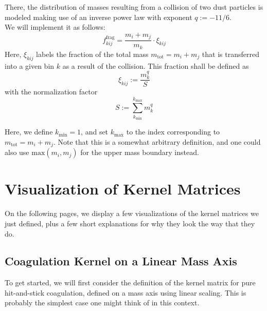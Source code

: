         There, the distribution of masses resulting from a collision of two dust particles 
        is modeled making use of an inverse power law with exponent $q := - 11/6$. \\

        We will implement it as follows:
        \begin{equation}
            f^\text{frag}_{kij} = \frac{m_i + m_j}{m_k} \cdot \xi_{kij}
        \end{equation}
        Here, $\xi_{kij}$ labels the fraction of the total mass $m_\text{tot} = m_i + m_j$ that 
        is transferred into a given bin $k$ as a result of the collision. 
        This fraction shall be defined as 
        \begin{equation}
            \xi_{kij} := \frac{m_k^q}{S}
        \end{equation}
        with the normalization factor
        \begin{equation}
            S := \sum_{k_\text{min}}^{k_\text{max}} m_k^q %
        \end{equation}

        Here, we define $k_\text{min}=1$, and set $k_\text{max}$ to the index corresponding
        to $m_\text{tot} = m_i + m_j$. Note that this is a somewhat arbitrary definition, and 
        one could also use $\text{max}(m_i, m_j)$ for the upper mass boundary instead.



\clearpage\section{Visualization of Kernel Matrices}
    
    On the following pages, we display a few visualizations of the kernel matrices we just 
    defined, plus a few short explanations for why they look the way that they do.

    \subsection{Coagulation Kernel on a Linear Mass Axis}
    \label{sec:coagulation_kernel_on_linear_mass_axis}

        To get started, we will first consider the definition of the kernel matrix 
        for pure hit-and-stick coagulation, defined on a mass axis using linear scaling.
        This is probably the simplest case one might think of in this context. \\

